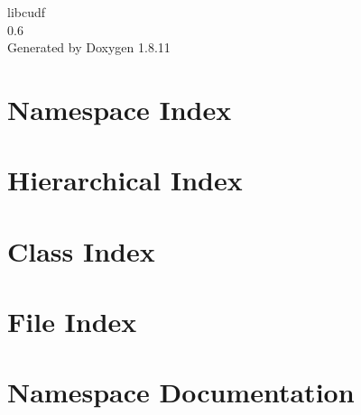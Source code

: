 \documentclass[twoside]{book}
\newcommand{\+}{\discretionary{\mbox{\scriptsize$\hookleftarrow$}}{}{}}
\newcommand{\clearemptydoublepage}{%
  \newpage{\pagestyle{empty}\cleardoublepage}%
}
\begin{document}
\hypersetup{pageanchor=false,
             bookmarksnumbered=true,
             pdfencoding=unicode
            }
\begin{titlepage}
\vspace*{7cm}
\begin{center}%
{\Large libcudf \\[1ex]\large 0.\+6 }\\
\vspace*{1cm}
{\large Generated by Doxygen 1.8.11}\\
\end{center}
\end{titlepage}
\clearemptydoublepage
\tableofcontents
\clearemptydoublepage
{}
\hypersetup{pageanchor=true}

\chapter{Namespace Index}

\chapter{Hierarchical Index}

\chapter{Class Index}

\chapter{File Index}

\chapter{Namespace Documentation}

\end{document}
